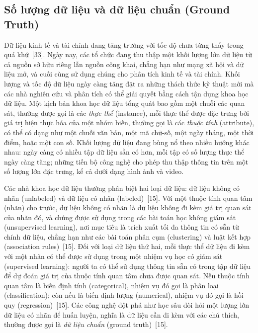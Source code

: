 \subsection{Số lượng dữ liệu và dữ liệu chuẩn (Ground Truth)}

Dữ liệu kinh tế và tài chính đang tăng trưởng với tốc độ chưa từng thấy trong quá khứ~[33]. Ngày nay, các tổ chức đang thu thập một khối lượng lớn dữ liệu từ cả nguồn sở hữu riêng lẫn nguồn công khai, chẳng hạn như mạng xã hội và dữ liệu mở, và cuối cùng sử dụng chúng cho phân tích kinh tế và tài chính. Khối lượng và tốc độ dữ liệu ngày càng tăng đặt ra những thách thức kỹ thuật mới mà các nhà nghiên cứu và phân tích có thể giải quyết bằng cách tận dụng khoa học dữ liệu. Một kịch bản khoa học dữ liệu tổng quát bao gồm một chuỗi các quan sát, thường được gọi là các \emph{thực thể} (instance), mỗi thực thể được đặc trưng bởi giá trị hiện thực hóa của một nhóm biến, thường gọi là các \emph{thuộc tính} (attribute), có thể có dạng như một chuỗi văn bản, một mã chữ-số, một ngày tháng, một thời điểm, hoặc một con số. Khối lượng dữ liệu đang bùng nổ theo nhiều hướng khác nhau: ngày càng có nhiều tập dữ liệu sẵn có hơn, mỗi tập có số lượng thực thể ngày càng tăng; những tiến bộ công nghệ cho phép thu thập thông tin trên một số lượng lớn đặc trưng, kể cả dưới dạng hình ảnh và video.

Các nhà khoa học dữ liệu thường phân biệt hai loại dữ liệu: dữ liệu không có nhãn (unlabeled) và dữ liệu có nhãn (labeled)~[15]. Với một thuộc tính quan tâm (nhãn) cho trước, dữ liệu không có nhãn là dữ liệu không đi kèm giá trị quan sát của nhãn đó, và chúng được sử dụng trong các bài toán học không giám sát (unsupervised learning), nơi mục tiêu là trích xuất tối đa thông tin có sẵn từ chính dữ liệu, chẳng hạn như các bài toán phân cụm (clustering) và luật kết hợp (association rules)~[15]. Đối với loại dữ liệu thứ hai, mỗi thực thể dữ liệu đi kèm với một nhãn có thể được sử dụng trong một nhiệm vụ học có giám sát (supervised learning): người ta có thể sử dụng thông tin sẵn có trong tập dữ liệu để dự đoán giá trị của thuộc tính quan tâm chưa được quan sát. Nếu thuộc tính quan tâm là biến định tính (categorical), nhiệm vụ đó gọi là phân loại (classification); còn nếu là biến định lượng (numerical), nhiệm vụ đó gọi là hồi quy (regression)~[15]. Các công nghệ đột phá như học sâu đòi hỏi một lượng lớn dữ liệu có nhãn để huấn luyện, nghĩa là dữ liệu cần đi kèm với các chú thích, thường được gọi là \emph{dữ liệu chuẩn} (ground truth)~[15].

